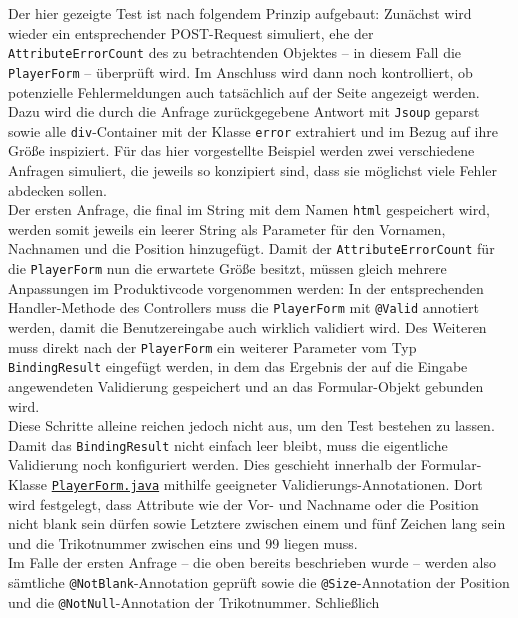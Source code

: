 Der hier gezeigte Test ist nach folgendem Prinzip aufgebaut: Zunächst wird wieder 
ein entsprechender POST-Request simuliert, ehe der \texttt{AttributeErrorCount} des 
zu betrachtenden Objektes -- in diesem Fall die \texttt{PlayerForm} -- überprüft 
wird. Im Anschluss wird dann noch kontrolliert, ob potenzielle Fehlermeldungen auch 
tatsächlich auf der Seite angezeigt werden. Dazu wird die durch die Anfrage 
zurückgegebene Antwort mit \texttt{Jsoup} geparst sowie alle \texttt{div}-Container 
mit der Klasse \texttt{error} extrahiert und im Bezug auf ihre Größe inspiziert. 
Für das hier vorgestellte Beispiel werden zwei verschiedene Anfragen simuliert, 
die jeweils so konzipiert sind, dass sie möglichst viele Fehler abdecken sollen. \\ 
Der ersten Anfrage, die final im String mit dem Namen \texttt{html} gespeichert 
wird, werden somit jeweils ein leerer String als Parameter für den Vornamen, 
Nachnamen und die Position hinzugefügt. Damit der \texttt{AttributeErrorCount} 
für die \texttt{PlayerForm} nun die erwartete Größe besitzt, müssen gleich 
mehrere Anpassungen im Produktivcode vorgenommen werden: In der entsprechenden 
Handler-Methode des Controllers muss die \texttt{PlayerForm} mit \texttt{@Valid} 
annotiert werden, damit die Benutzereingabe auch wirklich validiert wird. Des 
Weiteren muss direkt nach der \texttt{PlayerForm} ein weiterer Parameter vom Typ 
\texttt{BindingResult} eingefügt werden, in dem das Ergebnis der auf die Eingabe 
angewendeten Validierung gespeichert und an das Formular-Objekt gebunden wird. \\ 
Diese Schritte alleine reichen jedoch nicht aus, um den Test bestehen zu lassen. 
Damit das \texttt{BindingResult} nicht einfach leer bleibt, muss die eigentliche 
Validierung noch konfiguriert werden. Dies geschieht innerhalb der Formular-Klasse 
\href{https://github.com/FlorianOhmes/bat_spielzeitenplaner/blob/main/spielzeitenplaner/src/main/java/de/bathesis/spielzeitenplaner/web/forms/PlayerForm.java}{\texttt{PlayerForm.java}} 
mithilfe geeigneter Validierungs-Annotationen. 
Dort wird festgelegt, dass Attribute wie der Vor- und Nachname oder die Position 
nicht blank sein dürfen sowie Letztere zwischen einem und fünf Zeichen lang sein 
und die Trikotnummer zwischen eins und 99 liegen muss. \\ 
Im Falle der ersten Anfrage -- die oben bereits beschrieben wurde -- werden also 
sämtliche \texttt{@NotBlank}-Annotation geprüft sowie die \texttt{@Size}-Annotation 
der Position und die \texttt{@NotNull}-Annotation der Trikotnummer. Schließlich 
